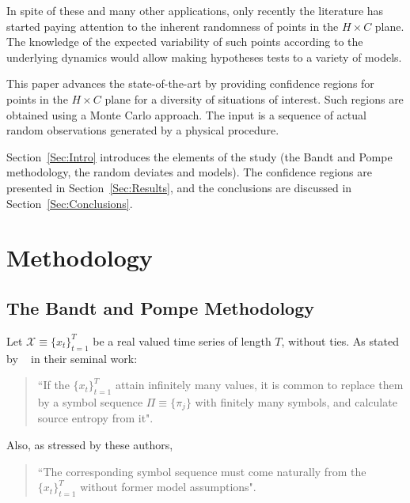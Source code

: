 \documentclass[sts]{imsart}
\begin{document}
In spite of these and many other applications, only recently \cites{OrdinalPatternProbabilities,NewPermutationEntropy} the literature has started paying attention to the inherent randomness of points in the $H\times C$ plane.
The knowledge of the expected variability of such points according to the underlying dynamics would allow making hypotheses tests to a variety of models.

This paper advances the state-of-the-art by providing confidence regions for points in the $H\times C$ plane for a diversity of situations of interest.
Such regions are obtained using a Monte Carlo approach.
The input is a sequence of actual random observations generated by a physical procedure.

Section~\ref{Sec:Intro} introduces the elements of the study (the Bandt and Pompe methodology, the random deviates and models).
The confidence regions are presented in Section~\ref{Sec:Results}, and the conclusions are discussed in Section~\ref{Sec:Conclusions}.


\section{Methodology}\label{Sec:Method}

\subsection{The Bandt and Pompe Methodology}

Let ${\mathcal X} \equiv \{x_t\}_{t=1}^{T}$ be a real valued time series of length $T$, without ties. 
As stated by \citeauthor{PermutationEntropyBandtPompe}~ in their seminal work:  
\begin{quote}
``If the $\{x_t\}_{t=1}^{T}$ attain infinitely many values, it is common to replace them by a symbol sequence 
$\Pi \equiv \{\pi_j\}$ with finitely many symbols, and calculate source entropy from it".
\end{quote}
Also, as stressed by these authors, 
\begin{quote}
``The corresponding symbol sequence must come 
naturally from the $\{x_t\}_{t=1}^{T}$ without former model assumptions".
\end{quote}
\end{document}
